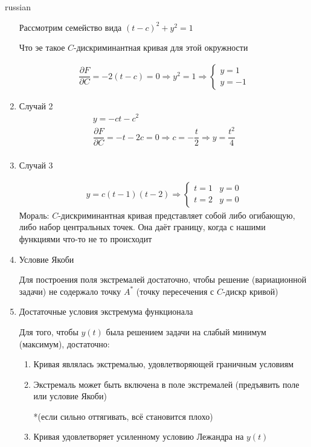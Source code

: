 \documentclass{article}
\begin{document}
\begin{otherlanguage*}{russian}
\begin{enumerate}
Рассмотрим семейство вида $ (t - c) ^ 2 + y ^ 2 = 1 $

Что эе такое $C$-дискриминантная кривая для этой окружности 

\begin{align*}
\dfrac{\partial F}{\partial C} = -2 (t - c) = 0 \Rightarrow y^2 = 1 \Rightarrow \begin{cases} y=1 \\ y= - 1 \end{cases}
\end{align*}

\item Случай 2 
\begin{align*}
y = - c t - c ^ 2 \\
\dfrac{\partial F}{\partial C} = -t -2c = 0 \Rightarrow c = - \dfrac{t}{2} \Rightarrow y = \dfrac{t^2}{4} \\
\end{align*}
\item Случай 3

\begin{align*}
y = c(t-1) (t-2) \Rightarrow \begin{cases} t=1 & y = 0 \\ t=2 & y = 0 \end{cases}
\end{align*}
Мораль: $C$-дискриминантная кривая представляет собой либо огибающую, либо набор центральных точек. Она даёт границу, когда с нашими функциями что-то не то происходит 

\item Условие Якоби

Для построения поля экстремалей достаточно, чтобы решение (вариационной задачи) не содержало точку $ A ^ * $ (точку пересечения с $ C$-дискр кривой) 

\item Достаточные условия экстремума функционала

Для того, чтобы $ y(t) $ была решением задачи на слабый минимум (максимум), достаточно: 
\begin{enumerate}
\item Кривая являлась экстремалью, удовлетворяющей граничным условиям 
\item Экстремаль может быть включена в поле экстремалей (предъявить поле или условие Якоби) 

*(если сильно оттягивать, всё становится плохо) 
\item Кривая удовлетворяет усиленному условию Лежандра на $ y(t) $  


\end{enumerate}
\end{enumerate}
\end{otherlanguage*}
\end{document}
